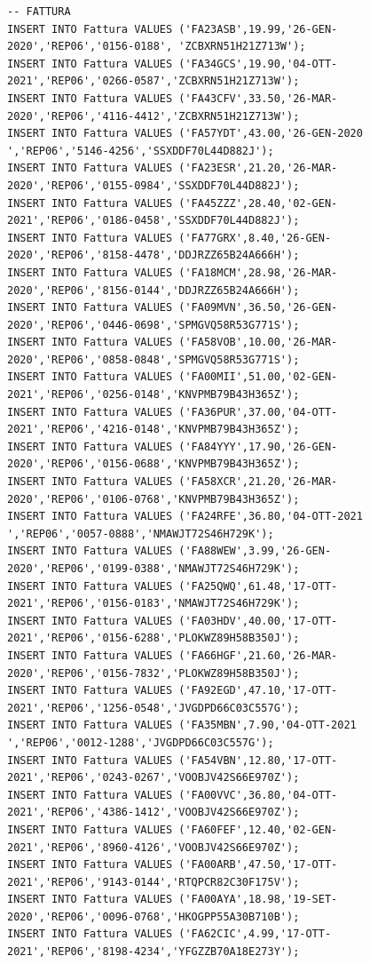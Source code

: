 \documentclass[12pt]{report}
\begin{document}
\begin{scriptsize}
\begin{verbatim}
-- FATTURA
INSERT INTO Fattura VALUES ('FA23ASB',19.99,'26-GEN-2020','REP06','0156-0188', 'ZCBXRN51H21Z713W');
INSERT INTO Fattura VALUES ('FA34GCS',19.90,'04-OTT-2021','REP06','0266-0587','ZCBXRN51H21Z713W');
INSERT INTO Fattura VALUES ('FA43CFV',33.50,'26-MAR-2020','REP06','4116-4412','ZCBXRN51H21Z713W');
INSERT INTO Fattura VALUES ('FA57YDT',43.00,'26-GEN-2020 ','REP06','5146-4256','SSXDDF70L44D882J');
INSERT INTO Fattura VALUES ('FA23ESR',21.20,'26-MAR-2020','REP06','0155-0984','SSXDDF70L44D882J');
INSERT INTO Fattura VALUES ('FA45ZZZ',28.40,'02-GEN-2021','REP06','0186-0458','SSXDDF70L44D882J');
INSERT INTO Fattura VALUES ('FA77GRX',8.40,'26-GEN-2020','REP06','8158-4478','DDJRZZ65B24A666H');
INSERT INTO Fattura VALUES ('FA18MCM',28.98,'26-MAR-2020','REP06','8156-0144','DDJRZZ65B24A666H');
INSERT INTO Fattura VALUES ('FA09MVN',36.50,'26-GEN-2020','REP06','0446-0698','SPMGVQ58R53G771S');
INSERT INTO Fattura VALUES ('FA58VOB',10.00,'26-MAR-2020','REP06','0858-0848','SPMGVQ58R53G771S');
INSERT INTO Fattura VALUES ('FA00MII',51.00,'02-GEN-2021','REP06','0256-0148','KNVPMB79B43H365Z');
INSERT INTO Fattura VALUES ('FA36PUR',37.00,'04-OTT-2021','REP06','4216-0148','KNVPMB79B43H365Z');
INSERT INTO Fattura VALUES ('FA84YYY',17.90,'26-GEN-2020','REP06','0156-0688','KNVPMB79B43H365Z');
INSERT INTO Fattura VALUES ('FA58XCR',21.20,'26-MAR-2020','REP06','0106-0768','KNVPMB79B43H365Z');
INSERT INTO Fattura VALUES ('FA24RFE',36.80,'04-OTT-2021 ','REP06','0057-0888','NMAWJT72S46H729K');
INSERT INTO Fattura VALUES ('FA88WEW',3.99,'26-GEN-2020','REP06','0199-0388','NMAWJT72S46H729K');
INSERT INTO Fattura VALUES ('FA25QWQ',61.48,'17-OTT-2021','REP06','0156-0183','NMAWJT72S46H729K');
INSERT INTO Fattura VALUES ('FA03HDV',40.00,'17-OTT-2021','REP06','0156-6288','PLOKWZ89H58B350J');
INSERT INTO Fattura VALUES ('FA66HGF',21.60,'26-MAR-2020','REP06','0156-7832','PLOKWZ89H58B350J');
INSERT INTO Fattura VALUES ('FA92EGD',47.10,'17-OTT-2021','REP06','1256-0548','JVGDPD66C03C557G');
INSERT INTO Fattura VALUES ('FA35MBN',7.90,'04-OTT-2021 ','REP06','0012-1288','JVGDPD66C03C557G');
INSERT INTO Fattura VALUES ('FA54VBN',12.80,'17-OTT-2021','REP06','0243-0267','VOOBJV42S66E970Z');
INSERT INTO Fattura VALUES ('FA00VVC',36.80,'04-OTT-2021','REP06','4386-1412','VOOBJV42S66E970Z');
INSERT INTO Fattura VALUES ('FA60FEF',12.40,'02-GEN-2021','REP06','8960-4126','VOOBJV42S66E970Z');
INSERT INTO Fattura VALUES ('FA00ARB',47.50,'17-OTT-2021','REP06','9143-0144','RTQPCR82C30F175V');
INSERT INTO Fattura VALUES ('FA00AYA',18.98,'19-SET-2020','REP06','0096-0768','HKOGPP55A30B710B');
INSERT INTO Fattura VALUES ('FA62CIC',4.99,'17-OTT-2021','REP06','8198-4234','YFGZZB70A18E273Y');

\end{verbatim}
\end{scriptsize}
\end{document}

